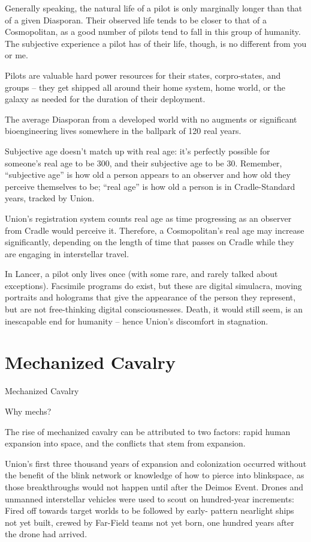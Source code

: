 Generally speaking, the natural life of a pilot is only marginally longer than that of a given
Diasporan. Their observed life tends to be closer to that of a Cosmopolitan, as a good number of
pilots tend to fall in this group of humanity. The subjective experience a pilot has of their life,
though, is no different from you or me.


Pilots are valuable hard power resources for their states, corpro-states, and groups -- they get
shipped all around their home system, home world, or the galaxy as needed for the duration of
their deployment.


The average Diasporan from a developed world with no augments or significant bioengineering
lives somewhere in the ballpark of 120 real years.


Subjective age doesn’t match up with real age: it’s perfectly possible for someone’s real age to
be 300, and their subjective age to be 30. Remember, “subjective age” is how old a person
appears to an observer and how old they perceive themselves to be; “real age” is how old a
person is in Cradle-Standard years, tracked by Union.





Union’s registration system counts real age as time progressing as an observer from Cradle
would perceive it. Therefore, a Cosmopolitan’s real age may increase significantly, depending on
the length of time that passes on Cradle while they are engaging in interstellar travel.


In Lancer, a pilot only lives once (with some rare, and rarely talked about exceptions). Facsimile
programs do exist, but these are digital simulacra, moving portraits and holograms that give the
appearance of the person they represent, but are not free-thinking digital consciousnesses.
Death, it would still seem, is an inescapable end for humanity -- hence Union’s discomfort in
stagnation.

\section{Mechanized Cavalry}
Mechanized Cavalry

Why mechs?


The rise of mechanized cavalry can be attributed to two factors: rapid human expansion into
space, and the conflicts that stem from expansion.


Union’s first three thousand years of expansion and colonization occurred without the benefit of
the blink network or knowledge of how to pierce into blinkspace, as those breakthroughs would
not happen until after the Deimos Event. Drones and unmanned interstellar vehicles were used to
scout on hundred-year increments: Fired off towards target worlds to be followed by early-
pattern nearlight ships not yet built, crewed by Far-Field teams not yet born, one hundred years
after the drone had arrived.



